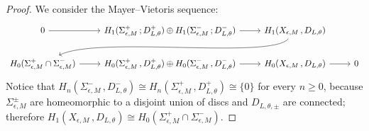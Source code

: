 \documentclass[12pt,reqno]{amsart}
\theoremstyle{definition}
\renewcommand{\=}{\;=\;}
\begin{document}
\begin{proof}
We consider the Mayer--Vietoris sequence:
\[
\begin{tikzcd}
 0\arrow[r]& H_1(\Sigma_{\epsilon,M}^{+}\,;D_{L,\theta}^{+})\oplus H_1(\Sigma_{\epsilon,M}^{-}\,;D_{L,\theta}^{-})\arrow[r]&H_1(X_{\epsilon,M}\,,D_{L,\theta})\arrow[dll,controls={(3.5,-0.5) and (-3.5,0.5)}] \\
H_0(\Sigma_{\epsilon,M}^{+}\cap\Sigma_{\epsilon,M}^{-})\arrow[r]&H_0(\Sigma_{\epsilon,M}^{+}\,,D_{L,\theta}^{+})\oplus H_0(\Sigma_{\epsilon,M}^{-}\,,D_{L,\theta}^{-})\arrow[r]&H_0(X_{\epsilon,M}\,,D_{L,\theta})\arrow[r]&0
\end{tikzcd}
\]
Notice that $H_n(\Sigma_{\epsilon,M}^{-}\,,D_{L,\theta}^{-})\cong H_n(\Sigma_{\epsilon,M}^{+}\,,D_{L,\theta}^{+})\cong \{0\}$ for every $n\ge 0$, because $\Sigma_{\epsilon,M}^{\pm}$ are homeomorphic to a disjoint union of discs and $D_{L,\theta,\pm}$ are connected; therefore $H_1(X_{\epsilon,M}\,,D_{L,\theta})\cong H_0(\Sigma_{\epsilon,M}^{+}\cap\Sigma_{\epsilon,M}^{-})$.

\medskip


\end{proof}
\end{document}
